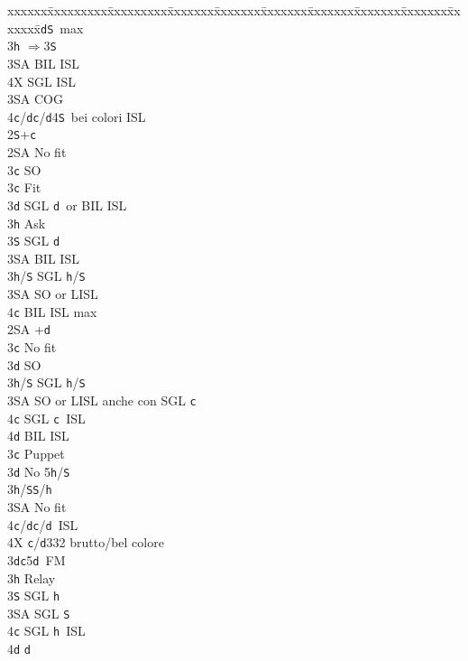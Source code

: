 \documentclass[a4paper,italian]{article}
\newcommand{\BS}{\small{\texttt{S}}}
\newcommand{\BC}{\small{\texttt{c}}}
\newcommand{\BD}{\small{\texttt{d}}}
\newcommand{\BH}{\small{\texttt{h}}}
\newenvironment{bidtable}
{\begin{tabbing}

    xxxxxx\=xxxxxxxxx\=xxxxxxxxx\=xxxxxxx\=xxxxxxx\=xxxxxxx\=xxxxxxx\=xxxxxxx\=xxxxxxx\=xxxxxxx\=\kill}
{\end{tabbing} }%
\begin{document}
\begin{multicols}{2}
\begin{bidtable}
        3\BD {}\BS\ max\+\\
        3\BH \> $\Rightarrow$3\BS\+\\
        3\small{SA} \> BIL ISL\\
        4X \> SGL ISL\-\\
        3\small{SA} \> COG\\
        4\BC/\BD {}\BC /\BD 4\BS\ bei colori ISL\-\-\\
        2\BS {}+\BC \+\\
        2\small{SA} \> No fit\+\\
        3\BC \> SO\-\\
        3\BC \> Fit\+\\
        3\BD \> SGL \BD\ or BIL ISL\+\\
        3\BH \> Ask\+\\
        3\BS \> SGL \BD \\
        3\small{SA} \> BIL ISL\-\-\\
        3\BH/\BS \> SGL \BH /\BS \\
        3\small{SA} \> SO or LISL\\
        4\BC \> BIL ISL max\-\-\\
        2\small{SA} +\BD \+\\
        3\BC \> No fit\+\\
        3\BD \> SO\\
        3\BH/\BS \> SGL \BH /\BS \\
        3\small{SA} \> SO or LISL anche con SGL \BC\\
        4\BC \> SGL \BC\ ISL\\
        4\BD \> BIL ISL\-\-\\
        3\BC \> Puppet\+\\
        3\BD \> No 5\BH /\BS \+\\
        3\BH/\BS {}\BS /\BH \+\\
        3\small{SA} \> No fit\+\\
        4\BC/\BD {}\BC /\BD\ ISL\-\-\\
        4X \BC /\BD 332 brutto/bel colore\-\-\\
        3\BD {}\BC 5\BD\ FM\+\\
        3\BH \> Relay\+\\
        3\BS \> SGL \BH \\
        3\small{SA} \> SGL \BS \\
        4\BC \> SGL \BH\ ISL\+\\
        4\BD \> \BD \\

\end{bidtable}
\end{multicols}
\end{document}

